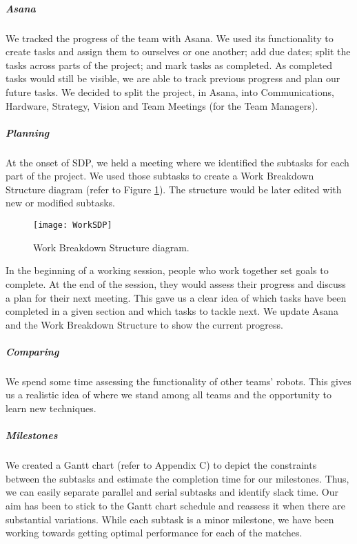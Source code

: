 \subparagraph{Asana}
We tracked the progress of the team with Asana. We used its functionality to create tasks and assign them to ourselves or one another; add due dates; split the tasks across parts of the project; and mark tasks as completed. As completed tasks would still be visible, we are able to track previous progress and plan our future tasks. We decided to split the project, in Asana, into Communications, Hardware, Strategy, Vision and Team Meetings (for the Team Managers).

\subparagraph{Planning}
At the onset of SDP, we held a meeting where we identified the subtasks for each part of the project. We used those subtasks to create a Work Breakdown Structure diagram (refer to Figure \ref{fig:diagram}). The structure would be later edited with new or modified subtasks.

\begin{figure}[H]
    \centering
    \texttt{[image: WorkSDP]}
    \caption{Work Breakdown Structure diagram.}
    \label{fig:diagram}
\end{figure}

In the beginning of a working session, people who work together set goals to complete. At the end of the session, they would assess their progress and discuss a plan for their next meeting. This gave us a clear idea of which tasks have been completed in a given section and which tasks to tackle next. We update Asana and the Work Breakdown Structure to show the current progress.

\subparagraph{Comparing}
We spend some time assessing the functionality of other teams' robots. This gives us a realistic idea of where we stand among all teams and the opportunity to learn new techniques.

\subparagraph{Milestones}
We created a Gantt chart (refer to Appendix C) to depict the constraints between the subtasks and estimate the completion time for our milestones. Thus, we can easily separate parallel and serial subtasks and identify slack time. Our aim has been to stick to the Gantt chart schedule and reassess it when there are substantial variations. While each subtask is a minor milestone, we have been working towards getting optimal performance for each of the matches.